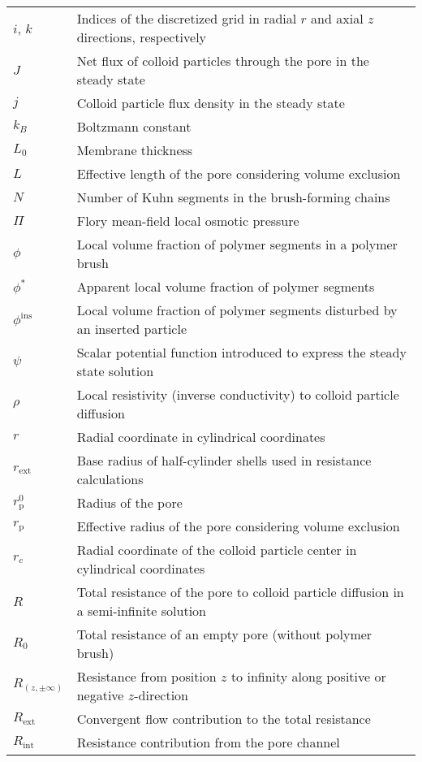 \documentclass[10pt, a4paper, twocolumn]{article}
\begin{document}
\begin{tabularx}{\linewidth}{l X}
    $i$, $k$ & Indices of the discretized grid in radial $r$ and axial $z$ directions, respectively \\
    $J$ & Net flux of colloid particles through the pore in the steady state \\
    $j$ & Colloid particle flux density in the steady state \\
    $k_B$ & Boltzmann constant \\
    $L_{0}$ & Membrane thickness \\
    $L$ & Effective length of the pore considering volume exclusion \\
    $N$ & Number of Kuhn segments in the brush-forming chains \\
    $\Pi$ & Flory mean-field local osmotic pressure \\
    $\phi$ & Local volume fraction of polymer segments in a polymer brush \\
    $\phi^{\ast}$ & Apparent local volume fraction of polymer segments \\
    $\phi^{\text{ins}}$ & Local volume fraction of polymer segments disturbed by an inserted particle \\
    $\psi$ & Scalar potential function introduced to express the steady state solution \\
    $\rho$ & Local resistivity (inverse conductivity) to colloid particle diffusion \\
    $r$ & Radial coordinate in cylindrical coordinates \\
    $r_{\text{ext}}$ & Base radius of half-cylinder shells used in resistance calculations\\
    $r_{\text{p}}^{0}$ & Radius of the pore \\
    $r_{\text{p}}$ & Effective radius of the pore considering volume exclusion \\
    $r_{c}$ & Radial coordinate of the colloid particle center in cylindrical coordinates \\
    $R$ & Total resistance of the pore to colloid particle diffusion in a semi-infinite solution \\
    $R_{0}$ & Total resistance of an empty pore (without polymer brush) \\
    $R_{(z, \pm\infty)}$ & Resistance from position $z$ to infinity along positive or negative $z$-direction \\
    $R_{\text{ext}}$ & Convergent flow contribution to the total resistance \\
    $R_{\text{int}}$ & Resistance contribution from the pore channel \\

\end{tabularx}
\end{document}
